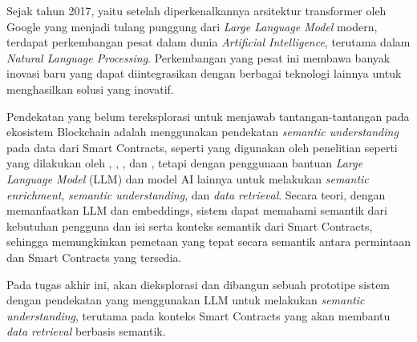 Sejak tahun 2017, yaitu setelah diperkenalkannya arsitektur transformer oleh Google yang menjadi tulang punggung dari \textit{Large Language Model} modern, terdapat perkembangan pesat dalam dunia \textit{Artificial Intelligence}, terutama dalam \textit{Natural Language Processing}. Perkembangan yang pesat ini membawa banyak inovasi baru yang dapat diintegrasikan dengan berbagai teknologi lainnya untuk menghasilkan solusi yang inovatif.

Pendekatan yang belum tereksplorasi untuk menjawab tantangan-tantangan pada ekosistem Blockchain adalah menggunakan pendekatan \textit{semantic understanding} pada data dari Smart Contracts, seperti yang digunakan oleh penelitian seperti yang dilakukan oleh \cite{third2017linked}, \cite{shi2021semantic}, \cite{stan}, dan \cite{sopek2018graphchain}, tetapi dengan penggunaan bantuan \textit{Large Language Model} (LLM) dan model AI lainnya untuk melakukan \textit{semantic enrichment}, \textit{semantic understanding}, dan \textit{data retrieval}. Secara teori, dengan memanfaatkan LLM dan embeddings, sistem dapat memahami semantik dari kebutuhan pengguna dan isi serta konteks semantik dari Smart Contracts, sehingga memungkinkan pemetaan yang tepat secara semantik antara permintaan dan Smart Contracts yang tersedia.


Pada tugas akhir ini, akan dieksplorasi dan dibangun sebuah prototipe sistem dengan pendekatan yang menggunakan LLM untuk melakukan \textit{semantic understanding}, terutama pada konteks Smart Contracts yang akan membantu \textit{data retrieval} berbasis semantik.



